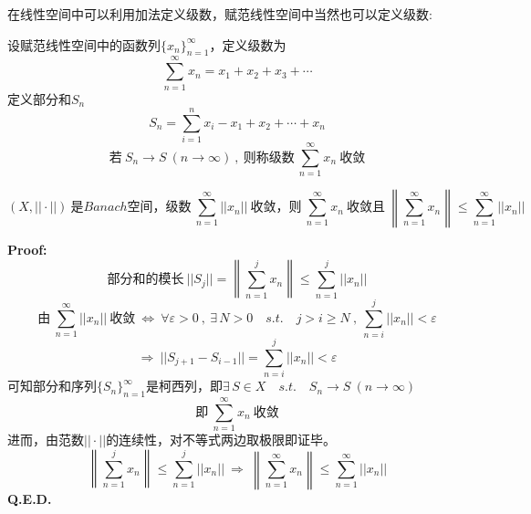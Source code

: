在线性空间中可以利用加法定义级数，赋范线性空间中当然也可以定义级数:
\begin{definition}
    设赋范线性空间中的函数列$\{x_n\}_{n=1}^{\infty}$，定义级数为
    \[\sum_{n=1}^{\infty}x_n=x_1+x_2+x_3+\cdots\]
    定义部分和$S_n$
    \[S_n=\sum_{i=1}^nx_i-x_1+x_2+\cdots+x_n\]
    \[\text{若} \ S_n \to S \ (n \to \infty) \ , \ \text{则称级数} \ \sum_{n=1}^{\infty}x_n \ \text{收敛}\]
\end{definition}
\begin{theorem}
    \[(X,||\cdot||) \ \text{是$Banach$空间，级数} \ \sum_{n=1}^{\infty}||x_n|| \ \text{收敛，则} \ \sum_{n=1}^{\infty}x_n \ \text{收敛且} \ \left\| \sum_{n=1}^{\infty}x_n \right\| \leq \sum_{n=1}^{\infty}||x_n||\]
\end{theorem}
\textbf{Proof:}
\[\text{部分和的模长} \ ||S_j||=\left\| \sum_{n=1}^jx_n \right\| \leq \sum_{n=1}^j||x_n||\]
\[\text{由} \ \sum_{n=1}^{\infty}||x_n|| \ \text{收敛} \ \Leftrightarrow \ \forall \varepsilon>0 \ , \ \exists \, N>0 \quad s.t. \quad j>i \geq N \ , \ \sum_{n=i}^j||x_n||<\varepsilon\]
\[\Rightarrow \ ||S_{j+1}-S_{i-1}||=\sum_{n=i}^j||x_n||<\varepsilon\]
可知部分和序列$\{S_n\}_{n=1}^{\infty}$是柯西列，即$\exists \, S \in X \quad s.t. \quad S_n \to S \ (n \to \infty)$
\[\text{即} \ \sum_{n=1}^{\infty}x_n \ \text{收敛}\]
进而，由范数$||\cdot||$的连续性，对不等式两边取极限即证毕。
\[\left\| \sum_{n=1}^jx_n \right\| \leq \sum_{n=1}^j||x_n|| \ \Rightarrow \ \left\| \sum_{n=1}^{\infty}x_n \right\| \leq \sum_{n=1}^{\infty}||x_n||\]
\textbf{Q.E.D.}

